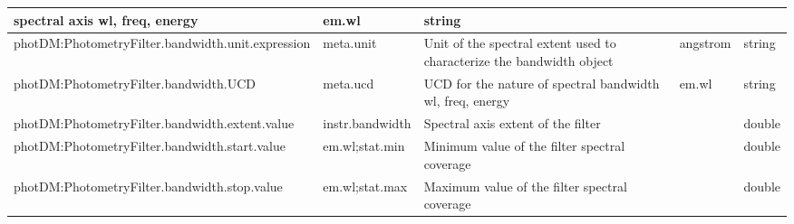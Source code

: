 \documentclass[11pt,a4paper]{ivoa}
\begin{document}
\begin{appendices}
\begin{table}[H]
\begin{adjustbox}{angle=90}
\begin{tabular}{p{5in}p{0.87in}p{2in}p{0.4in}p{0.25in}}
{{spectral axis wl, freq, energy}} &
\multicolumn{1}{p{0.74in}}{{\fontsize{8pt}{8pt}\selectfont em.wl}} &
\multicolumn{1}{p{0.35in}}{{\fontsize{8pt}{8pt}\selectfont string}} \\
\hline
\multicolumn{1}{p{5in}}{{\fontsize{8pt}{8pt}
\selectfont photDM:PhotometryFilter.bandwidth.unit.expression}} &
\multicolumn{1}{p{0.87in}}{{\fontsize{8pt}{8pt}\selectfont meta.unit}} &
\multicolumn{1}{p{2in}}{{\fontsize{8pt}{8pt}\selectfont Unit of the spectral extent 
used to characterize the bandwidth object}} &
\multicolumn{1}{p{0.74in}}{{\fontsize{10pt}{12.0pt}\selectfont angstrom}} &
\multicolumn{1}{p{0.35in}}{{\fontsize{8pt}{8pt}\selectfont string}} \\
\hline
\multicolumn{1}{p{5in}}{
{\fontsize{8pt}{8pt}\selectfont photDM:PhotometryFilter.bandwidth.UCD}} &
\multicolumn{1}{p{0.87in}}{{\fontsize{8pt}{8pt}\selectfont meta.ucd }} &
\multicolumn{1}{p{2in}}{{\fontsize{8pt}{8pt}\selectfont UCD for the nature of 
spectral bandwidth wl, freq, energy}} &
\multicolumn{1}{p{0.74in}}{{\fontsize{8pt}{8pt}\selectfont em.wl}} &
\multicolumn{1}{p{0.35in}}{{\fontsize{8pt}{8pt}\selectfont string}} \\
\hline
\multicolumn{1}{p{5in}}{{\fontsize{8pt}{8pt}
\selectfont photDM:PhotometryFilter.bandwidth.extent.value}} &
\multicolumn{1}{p{0.87in}}{{\fontsize{8pt}{8pt}\selectfont instr.bandwidth}} &
\multicolumn{1}{p{2in}}{{\fontsize{8pt}{8pt}\selectfont Spectral axis extent of the filter}} &
\multicolumn{1}{p{0.74in}}{} &
\multicolumn{1}{p{0.35in}}{{\fontsize{8pt}{8pt}\selectfont double}} \\
\hline
\multicolumn{1}{p{5in}}{{\fontsize{8pt}{8pt}
\selectfont photDM:PhotometryFilter.bandwidth.start.value}} &
\multicolumn{1}{p{0.87in}}{{\fontsize{8pt}{8pt}\selectfont em.wl;stat.min}} &
\multicolumn{1}{p{2in}}{{\fontsize{8pt}{8pt}\selectfont Minimum value of the filter 
spectral coverage}} &
\multicolumn{1}{p{0.74in}}{} &
\multicolumn{1}{p{0.35in}}{{\fontsize{8pt}{8pt}\selectfont double}} \\
\hline
\multicolumn{1}{p{5in}}{{\fontsize{8pt}{8pt}
\selectfont photDM:PhotometryFilter.bandwidth.stop.value}} &
\multicolumn{1}{p{0.87in}}{{\fontsize{8pt}{8pt}\selectfont em.wl;stat.max}} &
\multicolumn{1}{p{2in}}{{\fontsize{8pt}{8pt}\selectfont Maximum value of the 
filter spectral coverage}} &
\multicolumn{1}{p{0.74in}}{} &
\multicolumn{1}{p{0.35in}}{{\fontsize{8pt}{8pt}\selectfont double}} \\
\hline
\end{tabular}
\end{adjustbox}
 \end{table}



\end{appendices}
\end{document}
